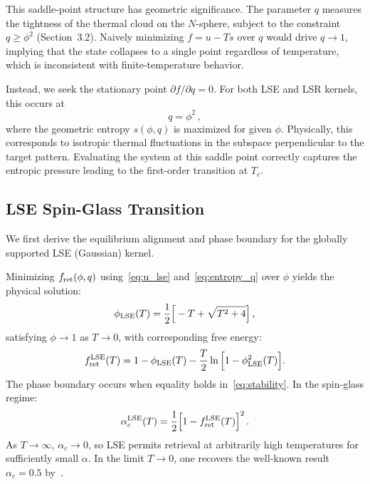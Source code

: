 \documentclass{article}
\theoremstyle{plain}
\theoremstyle{definition}
\theoremstyle{remark}
\begin{document}
This saddle-point structure has geometric significance. The parameter $q$ measures the tightness of the thermal cloud on the $N$-sphere, subject to the constraint $q \ge \phi^2$ (Section~3.2). Naively minimizing $f = u - Ts$ over $q$ would drive $q \to 1$, implying that the state collapses to a single point regardless of temperature, which is inconsistent with finite-temperature behavior.

Instead, we seek the stationary point $\partial f / \partial q = 0$. For both LSE and LSR kernels, this occurs at 
\begin{equation}
    q = \phi^2\,,
    \label{eq:q_constraint}
\end{equation}
where the geometric entropy $s(\phi, q)$ is maximized for given $\phi$. Physically, this corresponds to isotropic thermal fluctuations in the subspace perpendicular to the target pattern. Evaluating the system at this saddle point correctly captures the entropic pressure leading to the first-order transition at $T_c$.

\subsection{LSE Spin-Glass Transition}
We first derive the equilibrium alignment and phase boundary for the globally supported LSE (Gaussian) kernel.

Minimizing $f_{\rm ret}(\phi, q)$ using~\eqref{eq:u_lse} and~\eqref{eq:entropy_q} over $\phi$ yields the physical solution:
\begin{equation}
    \phi_{\rm LSE}(T) = \frac{1}{2} \Big[-T + \sqrt{T^2 + 4}\Big]\,,
    \label{eq:phi_lse}
\end{equation}
satisfying $\phi \to 1$ as $T \to 0$, with corresponding free energy:
\begin{equation}
    f_{\rm ret}^{\rm LSE}(T) = 1 - \phi_{\rm LSE}(T) - \frac{T}{2}\ln\Big[1 - \phi^2_{\rm LSE}(T)\Big].
    \label{eq:f_lse}
\end{equation}
The phase boundary occurs when equality holds in~\eqref{eq:stability}. In the spin-glass regime:
\begin{equation}
    \alpha_c^{\rm LSE}(T) = \frac{1}{2} \Big[1 - f_{\rm ret}^{\rm LSE}(T) \Big]^2\,.
    \label{eq:alpha_lse}
\end{equation}
As $T \to \infty$, $\alpha_c \to 0$, so LSE permits retrieval at arbitrarily high temperatures for sufficiently small $\alpha$. In the limit $T \to 0$, one recovers the well-known result $\alpha_c = 0.5$ by~\citet{ramsauer2021hopfield}.
\end{document}
